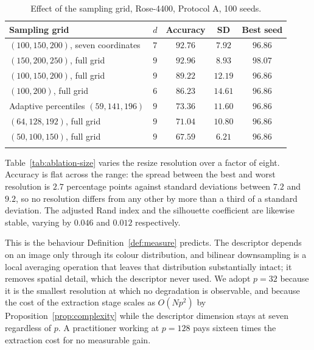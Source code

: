 \documentclass[pdflatex,sn-basic]{sn-jnl}
\theoremstyle{thmstyleone}%
\theoremstyle{thmstyletwo}%
\theoremstyle{thmstylethree}%
\begin{document}
\begin{table}[h]
\centering
\caption{Effect of the sampling grid, Rose-4400, Protocol A, 100
seeds.}\label{tab:ablation-levels}
\begin{tabular}{@{}lcccc@{}}
\toprule
Sampling grid & $d$ & Accuracy & SD & Best seed \\
\midrule
$(100,150,200)$, seven coordinates  & $7$ & $92.76$ & $7.92$  & $96.86$ \\
$(150,200,250)$, full grid          & $9$ & $92.96$ & $8.93$  & $\mathbf{98.07}$ \\
$(100,150,200)$, full grid          & $9$ & $89.22$ & $12.19$ & $96.86$ \\
$(100,200)$, full grid              & $6$ & $86.23$ & $14.61$ & $96.86$ \\
Adaptive percentiles $(59,141,196)$ & $9$ & $73.36$ & $11.60$ & $96.86$ \\
$(64,128,192)$, full grid           & $9$ & $71.04$ & $10.80$ & $96.86$ \\
$(50,100,150)$, full grid           & $9$ & $67.59$ & $6.21$  & $96.86$ \\
\botrule
\end{tabular}
\end{table}


Table~\ref{tab:ablation-size} varies the resize resolution over a factor of
eight. Accuracy is flat across the range: the spread between the best and worst
resolution is $2.7$ percentage points against standard deviations between
$7.2$ and $9.2$, so no resolution differs from any other by more than a third
of a standard deviation. The adjusted Rand index and the silhouette coefficient
are likewise stable, varying by $0.046$ and $0.012$ respectively.

This is the behaviour Definition~\ref{def:measure} predicts. The descriptor
depends on an image only through its colour distribution, and bilinear
downsampling is a local averaging operation that leaves that distribution
substantially intact; it removes spatial detail, which the descriptor never
used. We adopt $p=32$ because it is the smallest resolution at which no
degradation is observable, and because the cost of the extraction stage scales
as $O(Np^2)$ by Proposition~\ref{prop:complexity} while the descriptor
dimension stays at seven regardless of $p$. A practitioner working at
$p=128$ pays sixteen times the extraction cost for no measurable gain.
\end{document}
